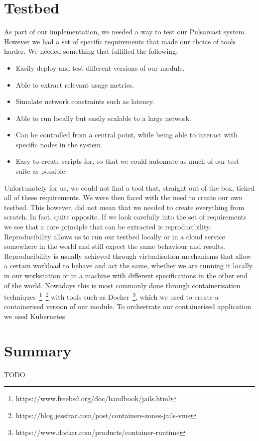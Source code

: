 \section{Testbed}\label{testbed}

As part of our implementation, we needed a way to test our Pulsarcast system.
However we had a set of specific requirements that made our choice of tools
harder. We needed something that fulfilled the following:

\begin{itemize}
  \item Easily deploy and test different versions of our module.
	\item Able to extract relevant usage metrics.
  \item Simulate network constraints such as latency.
  \item Able to run locally but easily scalable to a large network.
  \item Can be controlled from a central point, while being able to interact
    with specific nodes in the system.
  \item Easy to create scripts for, so that we could automate as much of our
    test suite as possible.
\end{itemize}

Unfortunately for us, we could not find a tool that, straight out of the box,
ticked all of these requirements. We were then faced with the need to create
our own testbed. This however, did not mean that we needed to create everything
from scratch. In fact, quite opposite. If we look carefully into the set of
requirements we see that a core principle that can be extracted is
reproducibility. Reproducibility allows us to run our testbed locally or in a
cloud service somewhere in the world and still expect the same behaviour and
results. Reproducibility is usually achieved through virtualisation mechanisms
that allow a certain workload to behave and act the same, whether we are
running it locally in our workstation or in a machine with different
specifications in the other end of the world. Nowadays this is most commonly
done through containerisation
techniques~\footnote{https://www.freebsd.org/doc/handbook/jails.html}~\footnote{https://blog.jessfraz.com/post/containers-zones-jails-vms}
with tools such as
Docker~\footnote{https://www.docker.com/products/container-runtime}, which we
used to create a containerised version of our module. To orchestrate our containerised application we used Kubernetes

\section{Summary}\label{summary}

TODO
